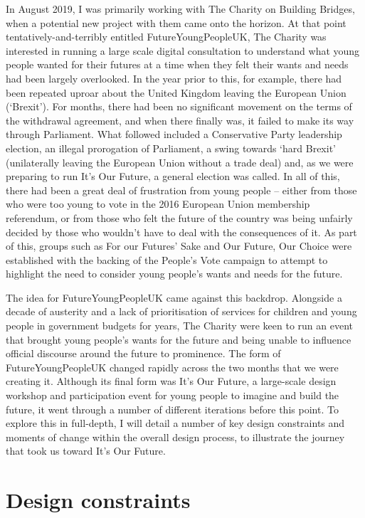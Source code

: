 In August 2019, I was primarily working with The Charity on Building Bridges, when a potential new project with them came onto the horizon. At that point tentatively-and-terribly entitled FutureYoungPeopleUK, The Charity was interested in running a large scale digital consultation to understand what young people wanted for their futures at a time when they felt their wants and needs had been largely overlooked. In the year prior to this, for example, there had been repeated uproar about the United Kingdom leaving the European Union (‘Brexit’). For months, there had been no significant movement on the terms of the withdrawal agreement, and when there finally was, it failed to make its way through Parliament. What followed included a Conservative Party leadership election, an illegal prorogation of Parliament, a swing towards ‘hard Brexit’ (unilaterally leaving the European Union without a trade deal) and, as we were preparing to run It’s Our Future, a general election was called. In all of this, there had been a great deal of frustration from young people – either from those who were too young to vote in the 2016 European Union membership referendum, or from those who felt the future of the country was being unfairly decided by those who wouldn’t have to deal with the consequences of it. As part of this, groups such as For our Futures’ Sake and Our Future, Our Choice were established with the backing of the People’s Vote campaign to attempt to highlight the need to consider young people’s wants and needs for the future.

The idea for FutureYoungPeopleUK came against this backdrop. Alongside a decade of austerity and a lack of prioritisation of services for children and young people in government budgets for years, The Charity were keen to run an event that brought young people’s wants for the future and being unable to influence official discourse around the future to prominence. The form of FutureYoungPeopleUK changed rapidly across the two months that we were creating it. Although its final form was It’s Our Future, a large-scale design workshop and participation event for young people to imagine and build the future, it went through a number of different iterations before this point. To explore this in full-depth, I will detail a number of key design constraints and moments of change within the overall design process, to illustrate the journey that took us toward It’s Our Future.

\section{Design constraints}

